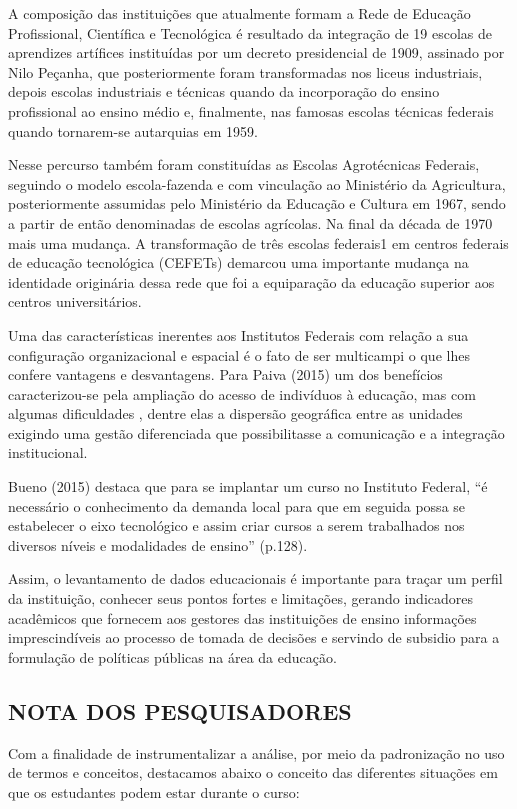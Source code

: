\documentclass[article,12pt,onesidea,4paper,english,brazil]{abntex2}
\begin{document}
	A composição das instituições que atualmente formam a Rede de Educação Profissional,
	Científica e Tecnológica é resultado da integração de 19 escolas de aprendizes artífices instituídas
	por um decreto presidencial de 1909, assinado por Nilo Peçanha, que posteriormente foram
	transformadas nos liceus industriais, depois escolas industriais e técnicas quando da incorporação
	do ensino profissional ao ensino médio e, finalmente, nas famosas escolas técnicas federais
	quando tornarem-se autarquias em 1959.
	
	Nesse percurso também foram constituídas as Escolas Agrotécnicas Federais, seguindo o
	modelo escola-fazenda e com vinculação ao Ministério da Agricultura, posteriormente assumidas
	pelo Ministério da Educação e Cultura em 1967, sendo a partir de então denominadas de escolas
	agrícolas. Na final da década de 1970 mais uma mudança. A transformação de três escolas
	federais1
	em centros federais de educação tecnológica (CEFETs) demarcou uma importante
	mudança na identidade originária dessa rede que foi a equiparação da educação superior aos
	centros universitários.
	
	Uma das características inerentes aos Institutos Federais com relação a sua configuração
	organizacional e espacial é o fato de ser multicampi o que lhes confere vantagens e desvantagens.
	Para Paiva (2015) um dos benefícios caracterizou-se pela ampliação do acesso de indivíduos à
	educação, mas com algumas dificuldades , dentre elas a dispersão geográfica entre as unidades
	exigindo uma gestão diferenciada que possibilitasse a comunicação e a integração institucional. 
	
	Bueno (2015) destaca que para se implantar um curso no Instituto Federal, “é necessário o
	conhecimento da demanda local para que em seguida possa se estabelecer o eixo tecnológico e
	assim criar cursos a serem trabalhados nos diversos níveis e modalidades de ensino” (p.128).
	
	Assim, o levantamento de dados educacionais é importante para traçar um perfil da
	instituição, conhecer seus pontos fortes e limitações, gerando indicadores acadêmicos que
	fornecem aos gestores das instituições de ensino informações imprescindíveis ao processo de
	tomada de decisões e servindo de subsidio para a formulação de políticas públicas na área da
	educação.
	
	\subsection*{NOTA DOS PESQUISADORES}
	Com a finalidade de instrumentalizar a análise, por meio da padronização no uso de termos e
	conceitos, destacamos abaixo o conceito das diferentes situações em que os estudantes podem
	estar durante o curso:
	
\end{document}
